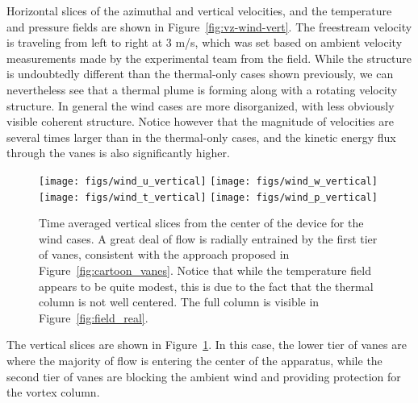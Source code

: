 Horizontal slices of the azimuthal and vertical velocities, and the 
temperature and pressure fields are shown in
Figure~\ref{fig:vz-wind-vert}. The freestream
velocity is traveling from left to right at 3 m/s, which was set based
on ambient velocity measurements made by the experimental team from the
field. While the structure is undoubtedly different than the
thermal-only cases shown previously, we can nevertheless see that a
thermal plume is forming along with a rotating velocity structure. In
general the wind cases are more disorganized, with less obviously
visible coherent structure. Notice however that the magnitude of
velocities are several times larger than in the thermal-only cases, and
the kinetic energy flux through the vanes is also significantly higher.   

%
%

\begin{figure}[htb]
  \centering
  \texttt{[image: figs/wind\_u\_vertical]}
  \hfill
  \texttt{[image: figs/wind\_w\_vertical]}
  \\
  \centering
  \texttt{[image: figs/wind\_t\_vertical]}
  \hfill
  \texttt{[image: figs/wind\_p\_vertical]}
  \\
 \caption{Time averaged vertical slices from the center of the device
 for the wind cases. A great deal of flow is radially entrained by the
 first tier of vanes, consistent with the approach proposed in
 Figure~\ref{fig:cartoon_vanes}. Notice that while the temperature field
  appears to be quite modest, this is due to the fact that the thermal
  column is not well centered. The full column is visible in
  Figure~\ref{fig:field_real}.}
 \label{fig:wind-ver}
\end{figure}

The vertical slices are shown in Figure~\ref{fig:wind-ver}. In this
case, the lower tier of vanes are where the majority of flow is 
entering the center of the apparatus, while the second tier of vanes are
blocking the ambient wind and providing protection for the vortex column. 

